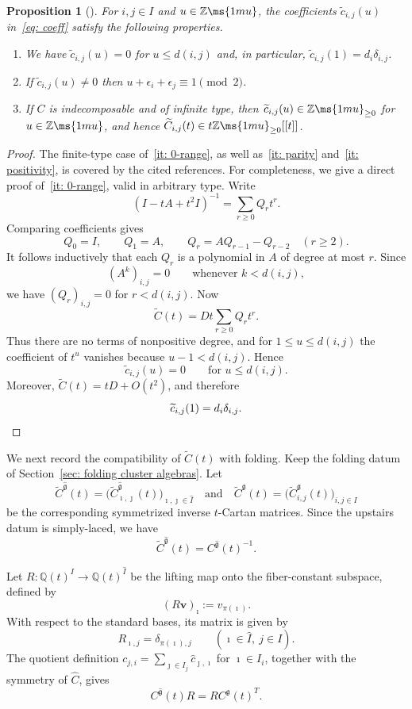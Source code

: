 \documentclass[12pt, leqno]{amsart}
\numberwithin{equation}{section}
\newenvironment{red}{\relax\color{red}}{\relax}
\newcommand{\ber}{\begin{red}}
\newcommand{\er}{\end{red}}
\theoremstyle{plain}
\newtheorem{proposition}[lemma]{Proposition}
\theoremstyle{definition}
\newcommand{\seteq}{\mathbin{:=}}
\newcommand{\g}{\mathfrak{g}}
\newcommand{\Q}{\mathbb{Q}}
\newcommand{\Z}{\mathbb{Z}\ms{1mu}}
\newcommand{\im}{\imath}
\newcommand{\jm}{\jmath}
\newcommand{\tC}{\widetilde{C}}
\newcommand{\tc}{\widetilde{c}}
\newcommand{\hC}{\widehat{C}}
\newcommand{\hI}{\widehat{I}}
\newcommand{\hc}{\widehat{c}}
\newcommand{\hg}{{\widehat{\g}}}
\newcommand{\bfv}{\mathbf{v}}
\newcommand{\qtq}[1][{and}]{\quad\text{{#1}}\quad}
\newcommand{\ee}{\end{enumerate}}
\newcommand{\bnum}{\begin{enumerate}[{\rm (i)}]}
\newcommand{\ws}[1]{\leavevmode\todo[size=\tiny,color=red!30]{\fontsize{6}{7}\selectfont #1}}
\newcommand{\berJ}{\ber}
\begin{document}
\begin{proposition}[{\cite{Fuj22a,FO21,KO23,FM21,FM23general}}]
\label{prop: coefficients of inverse t-Cartan}
For \(i,j\in I\) and \(u\in\Z\), the coefficients $\tc_{i,j}(u)$ in~\eqref{eq: coeff}
satisfy the following properties.
\bnum
\item \label{it: 0-range}
We have $\tc_{i,j}(u)=0$ for $u\leq d(i,j)$ and, in particular,
$\tc_{i,j}(1)=d_i\delta_{i,j}$.

\item \label{it: parity} If  $\tc_{i,j}(u)\ne0$
then $u+\epsilon_i+\epsilon_j\equiv1\pmod2$.


\item \label{it: positivity} If \(C\) is indecomposable and of infinite type, then
$\tc_{i,j}(u)\in\Z_{\geq0}$
for $u\in\Z$, 
and hence $\tC_{i,j}(t) \in t\Z_{\geq0}[[t]]$.
\ee
\end{proposition}



\begin{proof}
The finite-type case of~\eqref{it: 0-range}, as well as~\eqref{it: parity} and~\eqref{it: positivity}, is covered by
the cited references.  For completeness, we give a direct proof of~\eqref{it: 0-range}, valid in arbitrary type.  Write
\[
 (I-tA+t^2I)^{-1}=\sum_{r\geq0}Q_rt^r.
\]
Comparing coefficients gives
\[
 Q_0=I,\qquad Q_1=A,\qquad
 Q_r=AQ_{r-1}-Q_{r-2}\quad(r\geq2).
\]
It follows inductively that each \(Q_r\) is a polynomial in \(A\) of
degree at most \(r\).  Since
\[
 (A^k)_{i,j}=0\qquad\text{whenever }k<d(i,j),
\]
we have \((Q_r)_{i,j}=0\) for \(r<d(i,j)\).  Now
\[
 \tC(t)=Dt\sum_{r\geq0}Q_rt^r.
\]
Thus there are no terms of nonpositive degree, and for
\(1\leq u\leq d(i,j)\) the coefficient of \(t^u\) vanishes because
\(u-1<d(i,j)\).  Hence
\[
 \tc_{i,j}(u)=0\qquad\text{for }u\leq d(i,j).
\]
Moreover, \(\tC(t)=tD+O(t^2)\), and therefore
\[
 \tc_{i,j}(1)=d_i\delta_{i,j}. \qedhere
\]
\end{proof}

We next record the compatibility of
\(\tC(t)\) with folding.  Keep the folding datum of
Section~\ref{sec: folding cluster algebras}.  
Let
\[
\tC^\hg(t) = \bigl( \tC_{\im,\jm}^\hg(t) \bigr)_{\im,\jm\in\hI} 
\qtq 
\tC^\g(t) = \bigl( \tC_{i,j}^\g(t) \bigr)_{i,j\in I} 
\]
be the corresponding symmetrized inverse \(t\)-Cartan matrices.
Since the upstairs datum is simply-laced, we have 
\[
\tC^\hg(t) = C^\hg(t)^{-1}.
\]

Let $R:\Q(t)^I\longrightarrow\Q(t)^{\hI}$
be the lifting map onto the fiber-constant subspace, defined by
\[
(R\bfv)_\im \seteq v_{\pi(\im)}.
\]
With respect to the standard bases, its matrix is given by
\[
R_{\im,j} = \delta_{\pi(\im),j}  \qquad (\im\in\hI,\ j\in I).
\]
The quotient definition
\(c_{j,i}=\sum_{\jm\in I_j}\hc_{\jm,\im}\) for \(\im\in I_i\),
together with the symmetry of \(\hC\), gives %
\begin{equation}\label{eq: folding of t-Cartan matrices}
C^\hg(t)R = RC^\g(t)^T.
\end{equation}
\end{document}
